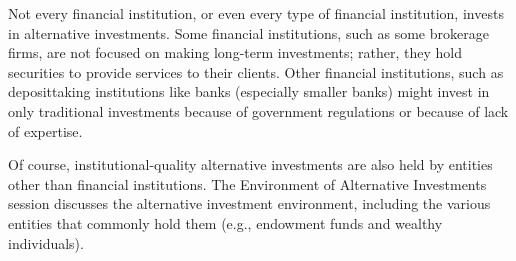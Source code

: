 \documentclass[11pt]{article}
\begin{document}
Not every financial institution, or even every type of financial institution, invests in alternative investments. Some financial institutions, such as some brokerage firms, are not focused on making long-term investments; rather, they hold securities to provide services to their clients. Other financial institutions, such as deposittaking institutions like banks (especially smaller banks) might invest in only traditional investments because of government regulations or because of lack of expertise.

Of course, institutional-quality alternative investments are also held by entities other than financial institutions. The Environment of Alternative Investments session discusses the alternative investment environment, including the various entities that commonly hold them (e.g., endowment funds and wealthy individuals).
\end{document}
